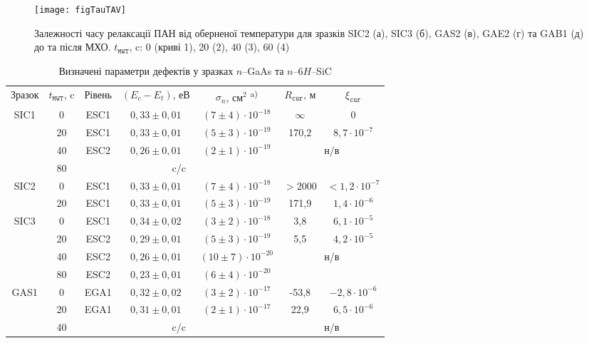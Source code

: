 \begin{figure}
\center
\texttt{[image: figTauTAV]}
\caption{\label{figTauTAV}
Залежності часу релаксації ПАН від оберненої температури для
зразків SIC2 (а), SIC3 (б), GAS2 (в), GAE2 (г) та GAB1 (д) до та після МХО.
$t_\mathtt{MWT}$, c: 0 (криві 1), 20 (2), 40 (3), 60 (4)
}%
\end{figure}

\begin{table}
\caption{\label{tabMW}Визначені параметри дефектів у зразках $n$--GaAs та $n$--6$H$--SiC
}
\center
\renewcommand{\arraystretch}{0.95}
\begin{tabular}{|c|c|c|c|c|c|c|}
\hline
Зразок& $t_\mathtt{MWT}$, c &Рівень &$(E_c-E_t)$, еВ &$\sigma_n$, см$^2$\textsuperscript{ a)}&$R_\mathtt{cur}$, м&$\xi_\mathtt{cur}$\\
\hhline{|=======|}
SIC1& 0 &ESC1& $0,33\pm0,01$ &$(7\pm4)\cdot10^{-18}$&$\infty$&0\\ \cline{2-7}
& 20 &ESC1& $0,33\pm0,01$ &$(5\pm3)\cdot10^{-19}$&170,2&$8,7\cdot10^{-7}$\\ \cline{2-7}
& 40 &ESC2& $0,26\pm0,01$ &$(2\pm1)\cdot10^{-19}$&\multicolumn{2}{c|}{\multirow{2}{*}{н/в}}\\ \cline{2-5}
& 80 & \multicolumn{3}{c|}{c/c}&\multicolumn{2}{c|}{}\\ \hline
SIC2& 0 &ESC1& $0,33\pm0,01$ &$(7\pm4)\cdot10^{-18}$&$>2000$&$<1,2\cdot10^{-7}$\\ \cline{2-7}
& 20 &ESC1& $0,33\pm0,01$ &$(5\pm3)\cdot10^{-19}$&171,9&$1,4\cdot10^{-6}$\\ \hline
SIC3& 0 &ESC1& $0,34\pm0,02$ &$(3\pm2)\cdot10^{-18}$&3,8&$6,1\cdot10^{-5}$\\ \cline{2-7}
& 20 &ESC2&$0,29\pm0,01$ &$(5\pm3)\cdot10^{-19}$&5,5&$4,2\cdot10^{-5}$\\ \cline{2-7}
& 40 &ESC2& $0,26\pm0,01$ &$(10\pm7)\cdot10^{-20}$&\multicolumn{2}{c|}{\multirow{2}{*}{н/в}}\\ \cline{2-5}
& 80 &ESC2& $0,23\pm0,01$ &$(6\pm4)\cdot10^{-20}$&\multicolumn{2}{c|}{}\\ \hline
GAS1& 0 &EGA1& $0,32\pm0,02$ &$(3\pm2)\cdot10^{-17}$&-53,8&$-2,8\cdot10^{-6}$\\ \cline{2-7}
& 20 &EGA1& $0,31\pm0,01$ &$(2\pm1)\cdot10^{-17}$&22,9&$6,5\cdot10^{-6}$\\ \cline{2-7}
& 40 & \multicolumn{3}{c|}{c/c}&\multicolumn{2}{c|}{н/в}\\ \hline

\end{tabular}
\end{table}
